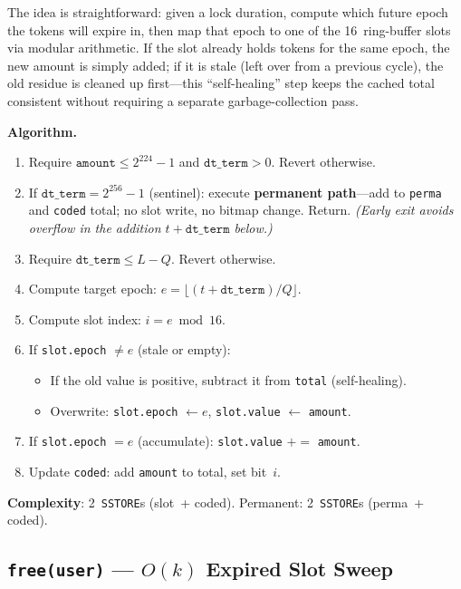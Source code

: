 \documentclass[10pt,a4paper,twocolumn]{article}
\theoremstyle{definition}
\theoremstyle{plain}
\theoremstyle{remark}
\begin{document}
The idea is straightforward: given a lock duration, compute which future epoch the tokens will expire in, then map that epoch to one of the 16~ring-buffer slots via modular arithmetic.  If the slot already holds tokens for the same epoch, the new amount is simply added; if it is stale (left over from a previous cycle), the old residue is cleaned up first---this ``self-healing'' step keeps the cached total consistent without requiring a separate garbage-collection pass.

\textbf{Algorithm.}
\begin{enumerate}[leftmargin=*, nosep, start=0]
\item Require $\texttt{amount} \leq 2^{224}{-}1$ and $\texttt{dt\_term} > 0$. Revert otherwise.
\item If $\texttt{dt\_term} = 2^{256}{-}1$ (sentinel): execute \textbf{permanent path}---add to \texttt{perma} and \texttt{coded} total; no slot write, no bitmap change. Return. \emph{(Early exit avoids overflow in the addition $t + \texttt{dt\_term}$ below.)}
\item Require $\texttt{dt\_term} \leq L - Q$. Revert otherwise.
\item Compute target epoch: $e = \lfloor(t + \texttt{dt\_term}) / Q\rfloor$.
\item Compute slot index: $i = e \bmod 16$.
\item If \texttt{slot.epoch} $\neq e$ (stale or empty):
    \begin{itemize}[nosep]
    \item If the old value is positive, subtract it from \texttt{total} (self-healing).
    \item Overwrite: \texttt{slot.epoch} $\leftarrow e$, \texttt{slot.value} $\leftarrow$ \texttt{amount}.
    \end{itemize}
\item If \texttt{slot.epoch} $= e$ (accumulate): \texttt{slot.value} $\mathrel{+}=$ \texttt{amount}.
\item Update \texttt{coded}: add \texttt{amount} to total, set bit~$i$.
\end{enumerate}

\textbf{Complexity}: 2~\texttt{SSTORE}s (slot~+ coded). Permanent: 2~\texttt{SSTORE}s (perma~+ coded).

\subsection{\texttt{free(user)} --- $O(k)$ Expired Slot Sweep}
\label{subsec:free}
\end{document}
